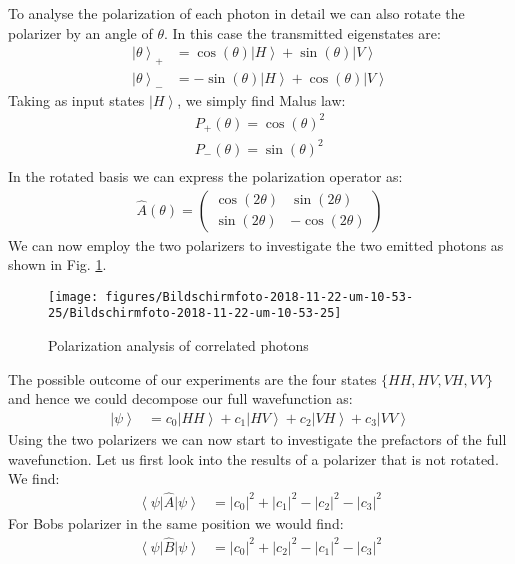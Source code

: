 \documentclass[10pt]{article}
\newcommand{\bra}[1]{\ensuremath{\left\langle#1\right|}}
\newcommand{\ket}[1]{\ensuremath{\left|#1\right\rangle}}
\begin{document}
To analyse the polarization of each photon in detail we can also rotate the polarizer by an angle of $\theta$. In this case the transmitted eigenstates are:
\begin{align}
\ket{\theta}_{+} &= \cos(\theta)\ket{H} +\sin(\theta)\ket{V}\\
\ket{\theta}_{-} &= -\sin(\theta)\ket{H} +\cos(\theta)\ket{V}
\end{align}
Taking as input states $\ket{H}$, we simply find Malus law:
\begin{align}
P_+(\theta) = \cos(\theta)^2\\
P_-(\theta) = \sin(\theta)^2\\
\end{align}
In the rotated basis we can express the polarization operator as:
\begin{align}
\hat{A}(\theta) = \left(\begin{array}{cc}
\cos(2\theta)& \sin(2\theta)\\
\sin(2\theta)& -\cos(2\theta)
\end{array}\right)
\end{align}
We can now employ the two polarizers to investigate the two emitted photons as shown in Fig. \ref{762069}.
\begin{figure}[h!]
\begin{center}
\texttt{[image: figures/Bildschirmfoto-2018-11-22-um-10-53-25/Bildschirmfoto-2018-11-22-um-10-53-25]}
\caption{{Polarization analysis of correlated photons
{\label{762069}}%
}}
\end{center}
\end{figure}

The possible outcome of our experiments are the four states $\{HH, HV, VH, VV\}$ and hence we could decompose our full wavefunction as:
\begin{align}
\ket{\psi} &= c_0 \ket{HH}+ c_1 \ket{HV} + c_2 \ket{VH} + c_3\ket{VV}
\end{align}
Using the two polarizers we can now start to investigate the prefactors of the full wavefunction. Let us first look into the results of a polarizer that is not rotated. We find:
\begin{align}
\bra{\psi}\hat{A}\ket{\psi}&=|c_0|^2 + |c_1|^2 - |c_2|^2-|c_3|^2
\end{align}
For Bobs polarizer in the same position we would find:
\begin{align}
\bra{\psi}\hat{B}\ket{\psi}&=|c_0|^2+ |c_2|^2 - |c_1|^2 -|c_3|^2
\end{align}
\end{document}

